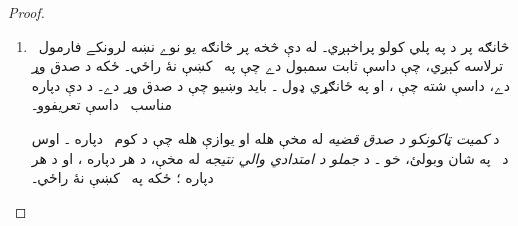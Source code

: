 \documentclass[12pt,a4paper,oneside]{report}
\theoremstyle{definition}
\begin{document}
\begin{proof}
\begin{enumerate}
\label{olpseg:OLP-0109-B016:start}
\item څانګه پر \LR{$\sFmla{\False}{\lforall[x][!A(x)]} \in \Gamma$} د
  \LR{$\TRule{\False}{\lforall}$} په پلي کولو پراخېږي۔ له دې څخه پر
  څانګه يو نوے نښه لرونکے فارمول~ ترلاسه
  کېږي، چې  داسې ثابت سمبول دے چې په~\LR{$\Gamma$} کښې نۀ راځي۔
  ځکه \LR{$\Gamma$} د صدق وړ دے، داسې  شته چې
  ، او په ځانګړي ډول
  ۔ بايد وښيو چې
   د صدق وړ دے۔ د دې دپاره
  مناسب~ داسې تعريفوو۔
\label{olpseg:OLP-0109-B016:end}

\label{olpseg:OLP-0109-B017:start}
د \emph{کميت ټاکونکو د صدق قضيه}\nobreakspace{} له مخې
   هله او يوازې هله چې د کوم~
  دپاره ۔ اوس  د~ په
  شان وبولئ، خو ۔ د
  \emph{جملو د امتدادي والي نتيجه}\nobreakspace{} له مخې، د هر
   دپاره ، او د هر
   دپاره ؛ ځکه
   په~\LR{$\Gamma$} کښې نۀ راځي۔
\label{olpseg:OLP-0109-B017:end}


\end{enumerate}
\end{proof}
\end{document}
